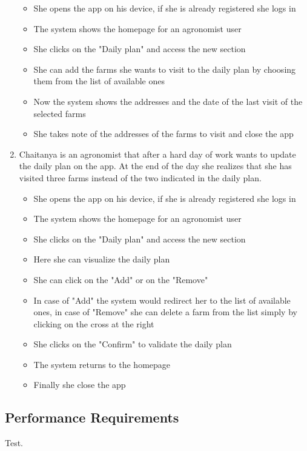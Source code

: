 \documentclass[table, 12pt]{article}
\begin{document}
\begin{enumerate}
    \begin{itemize}
        \item She opens the app on his device, if she is already registered she logs in
        \item The system shows the homepage for an agronomist user
        \item She clicks on the "Daily plan" and access the new section
        \item She can add the farms she wants to visit to the daily plan by choosing them from the list of available ones
        \item Now the system shows the addresses and the date of the last visit of the selected farms
        \item She takes note of the addresses of the farms to visit and close the app
    \end{itemize}
    \item Chaitanya is an agronomist that after a hard day of work wants to update the daily plan on the app.
    At the end of the day she realizes that she has visited three farms instead of the two indicated in the daily plan.
    \begin{itemize}
        \item She opens the app on his device, if she is already registered she logs in
        \item The system shows the homepage for an agronomist user
        \item She clicks on the "Daily plan" and access the new section
        \item Here she can visualize the daily plan
        \item She can click on the "Add" or on the "Remove"
        \item In case of "Add" the system would redirect her to the list of available ones, in case of "Remove" she can delete a farm 
        from the list simply by clicking on the cross at the right
        \item She clicks on the "Confirm" to validate the daily plan
        \item The system returns to the homepage
        \item Finally she close the app
    \end{itemize}
\end{enumerate}
\subsection{Performance Requirements}
Test.
\end{document}
